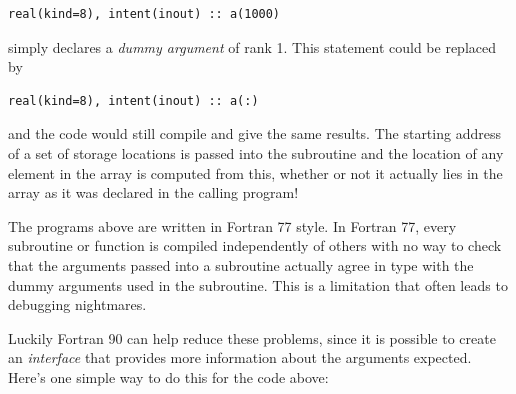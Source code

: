 \documentclass[letterpaper,10pt,english]{sphinxmanual}
\begin{document}
\begin{Verbatim}[commandchars=\\\{\}]
real(kind=8), intent(inout) :: a(1000)
\end{Verbatim}

simply declares a \emph{dummy argument} of rank 1.  This statement could be
replaced by

\begin{Verbatim}[commandchars=\\\{\}]
real(kind=8), intent(inout) :: a(:)
\end{Verbatim}

and the code would still compile and give the same results.  The starting
address of a set of storage locations is passed into the subroutine and the
location of any element in the array is computed from this, whether or not
it actually lies in the array as it was declared in the calling program!

The programs above are written in Fortran 77 style.
In Fortran 77, every subroutine or function is compiled independently of
others with no way to check that the arguments passed into a subroutine
actually agree in type with the dummy arguments used in the subroutine.
This is a limitation that often leads to debugging nightmares.

Luckily Fortran 90 can help reduce these problems, since it is possible to
create an \emph{interface} that provides more information about the arguments
expected.  Here's one simple way to do this for the code above:
\end{document}
